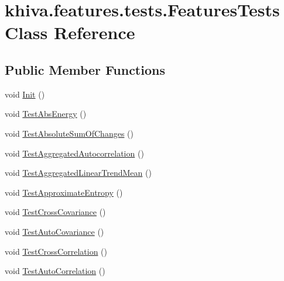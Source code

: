 \hypertarget{classkhiva_1_1features_1_1tests_1_1_features_tests}{}\section{khiva.\+features.\+tests.\+Features\+Tests Class Reference}
\label{classkhiva_1_1features_1_1tests_1_1_features_tests}
\subsection*{Public Member Functions}
\begin{DoxyCompactItemize}
\item 
void \mbox{\hyperlink{classkhiva_1_1features_1_1tests_1_1_features_tests_ab66ad8e9e59d29de45c9ce95031cb5b3}{Init}} ()
\item 
void \mbox{\hyperlink{classkhiva_1_1features_1_1tests_1_1_features_tests_a7c82c0f5592e5169fd533a3598718e48}{Test\+Abs\+Energy}} ()
\item 
void \mbox{\hyperlink{classkhiva_1_1features_1_1tests_1_1_features_tests_a2592e8726035a17d27cdc68452d8b869}{Test\+Absolute\+Sum\+Of\+Changes}} ()
\item 
void \mbox{\hyperlink{classkhiva_1_1features_1_1tests_1_1_features_tests_a20059bbc219f03d333da502442c01643}{Test\+Aggregated\+Autocorrelation}} ()
\item 
void \mbox{\hyperlink{classkhiva_1_1features_1_1tests_1_1_features_tests_a39802d69b6973184f2c4a1486d65e01a}{Test\+Aggregated\+Linear\+Trend\+Mean}} ()
\item 
void \mbox{\hyperlink{classkhiva_1_1features_1_1tests_1_1_features_tests_a7846d19ac2dec1b742830f0a3a950dc1}{Test\+Approximate\+Entropy}} ()
\item 
void \mbox{\hyperlink{classkhiva_1_1features_1_1tests_1_1_features_tests_a4e2b89b96bd4b372eef0ca5d8ce7233e}{Test\+Cross\+Covariance}} ()
\item 
void \mbox{\hyperlink{classkhiva_1_1features_1_1tests_1_1_features_tests_a3fad0e420ec54a51fb3cff75d1c2fb16}{Test\+Auto\+Covariance}} ()
\item 
void \mbox{\hyperlink{classkhiva_1_1features_1_1tests_1_1_features_tests_a58917785a5365cb25b6ca53d59714a0f}{Test\+Cross\+Correlation}} ()
\item 
void \mbox{\hyperlink{classkhiva_1_1features_1_1tests_1_1_features_tests_ae53df30c57cc9fcde4a7d6f283499b79}{Test\+Auto\+Correlation}} ()
\item 

\end{DoxyCompactItemize}
